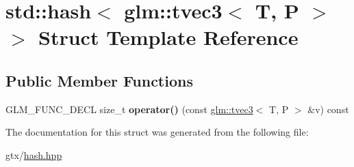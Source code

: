 \hypertarget{structstd_1_1hash_3_01glm_1_1tvec3_3_01T_00_01P_01_4_01_4}{\section{std\-:\-:hash$<$ glm\-:\-:tvec3$<$ T, P $>$ $>$ Struct Template Reference}
\label{structstd_1_1hash_3_01glm_1_1tvec3_3_01T_00_01P_01_4_01_4}
}
\subsection*{Public Member Functions}
\begin{DoxyCompactItemize}
\item 
\hypertarget{structstd_1_1hash_3_01glm_1_1tvec3_3_01T_00_01P_01_4_01_4_a07e56702363ce86931e60ce2b2a68878}{G\-L\-M\-\_\-\-F\-U\-N\-C\-\_\-\-D\-E\-C\-L size\-\_\-t {\bfseries operator()} (const \hyperlink{structglm_1_1tvec3}{glm\-::tvec3}$<$ T, P $>$ \&v) const }\label{structstd_1_1hash_3_01glm_1_1tvec3_3_01T_00_01P_01_4_01_4_a07e56702363ce86931e60ce2b2a68878}

\end{DoxyCompactItemize}


The documentation for this struct was generated from the following file\-:\begin{DoxyCompactItemize}
\item 
gtx/\hyperlink{hash_8hpp}{hash.\-hpp}\end{DoxyCompactItemize}
